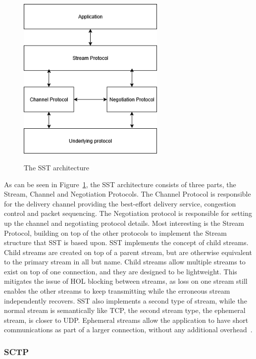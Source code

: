 \documentclass[english, 12pt, a4paper, elec, utf8, a-2b, online]{aaltothesis}
\begin{document}
\begin{figure}[h]
	\centering
	\includegraphics[alt={Diagram of the SST architecture.}, height=8cm]{./images/sst.png}
	\caption{The SST architecture}
	\label{fig:sst_arc}
\end{figure}

As can be seen in Figure~\ref{fig:sst_arc}, the SST architecture consists of three
parts, the Stream, Channel and Negotiation Protocols. The Channel Protocol is responsible
for the delivery channel providing the best-effort delivery service, congestion control
and packet sequencing. The Negotiation protocol is responsible for setting up the channel
and negotiating protocol details. Most interesting is the Stream Protocol, building on
top of the other protocols to implement the Stream structure that SST is based upon.
SST implements the concept of child streams. Child streams are created on top of
a parent stream, but are otherwise equivalent to the primary stream in all but name.
Child streams allow multiple streams to exist on top of one connection, and they
are designed to be lightweight. This mitigates the issue of HOL blocking between streams,
as loss on one stream still enables the other streams to keep transmitting while
the erroneous stream independently recovers. SST also implements a second type of stream,
while the normal stream is semantically like TCP, the second stream type, the ephemeral stream, is closer
to UDP. Ephemeral streams allow the application to have short communications as part
of a larger connection, without any additional overhead~\cite{sst}.


\subsubsection{SCTP}
\end{document}
